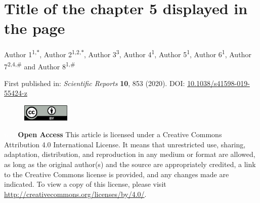 \chapter[Title of the chapter 5 displayed \\ in the table of contents]
    {Title of the chapter 5 displayed in the page
    }
\label{ch:labelchapter5}

\updatemylof %
\updatemylot %

\regularsection
\headerregularsection

Author 1\textsuperscript{1,\textcolor{sophia}{$\ast$}}, Author 2\textsuperscript{1,2,\textcolor{sophia}{$\ast$}}, Author 3\textsuperscript{3}, Author 4\textsuperscript{1}, Author 5\textsuperscript{1}, Author 6\textsuperscript{1}, Author 7\textsuperscript{2,4,\#} and Author 8\textsuperscript{1,\#} \hfill  \newline

\let\thefootnote\relax{}

\noindent First published in: \textit{Scientific Reports} \textbf{10}, 853 (2020). \hfill \break
DOI: \href{https://doi.org/10.1038/s41598-019-55424-z}{10.1038/s41598-019-55424-z} 

\begin{figure}
    \includegraphics[width=0.2\textwidth]{figures/by.png}
\end{figure} 

\noindent \textcolor{white}{test} \newline \textbf{Open Access} This article is licensed under a Creative Commons Attribution 4.0 International License. It means that unrestricted use, sharing, adaptation, distribution, and reproduction in any medium or format are allowed, as long as the original author(s) and the source are appropriately credited, a link to the Creative Commons license is provided, and any changes made are indicated. To view a copy of this license, please visit \href{http://creativecommons.org/licenses/by/4.0/}{http://creativecommons.org/licenses/by/4.0/}. \newline

